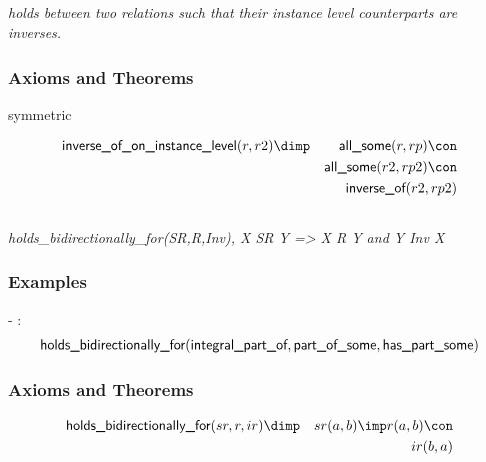 \subsection{ }
\emph{holds between two relations such that their instance level counterparts are inverses.}

\subsubsection{Axioms and Theorems}

\begin{clist}
\item symmetric
\end{clist}

\begin{eqnarray*}
 \pr{inverse\_of\_on\_instance\_level}(r, r2) &\dimp & \pr{all\_some}(r, rp) \con \\
&& \pr{all\_some}(r2, rp2) \con \\
&& \pr{inverse\_of}(r2, rp2) 
\end{eqnarray*}

\subsection{ }
\emph{holds\_bidirectionally\_for(SR,R,Inv), X SR Y => X R Y and Y Inv X}

\subsubsection{Examples}
\begin{clist}
\item - : \begin{eqnarray*}
 \mbox{\sf holds\_bidirectionally\_for}( \mbox{\sf integral\_part\_of},  \mbox{\sf part\_of\_some},  \mbox{\sf has\_part\_some}) 
\end{eqnarray*}

\end{clist}

\subsubsection{Axioms and Theorems}


\begin{eqnarray*}
 \pr{holds\_bidirectionally\_for}(sr, r, ir) &\dimp &sr(a, b) \imp r(a, b) \con \\
&&ir(b, a) 
\end{eqnarray*}

